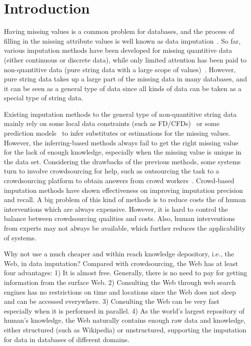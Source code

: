 \documentclass[sigconf]{acmart}
\begin{document}
%
%

\maketitle

\section{Introduction}

Having missing values is a common problem for databases, and the process of filling in the missing attribute values is well known as data imputation~\cite{li2012webput, wang2002empirical}. So far, various imputation methods have been developed for missing quantitive data (either continuous or discrete data), while only limited attention has been paid to non-quantitive data (pure string data with a large scope of values)~\cite{li2015trip}. However, pure string data takes up a large part of the missing data in many databases, and it can be seen as a general type of data since all kinds of data can be taken as a special type of string data.


Existing imputation methods to the general type of non-quantitive string data mainly rely on some local data constraints (such as FD/CFDs)~\cite{wu2004using, shen2007combined, bohannon2007conditional} or some prediction models~\cite{wang2002empirical, zhang2008parimputation} to infer substitutes or estimations for the missing values. However, the inferring-based methods always fail to get the right missing value for the lack of enough knowledge, especially when the missing value is unique in the data set. Considering the drawbacks of the previous methods, some systems turn to involve crowdsourcing for help, such as outsourcing the task to a crowdsourcing platform to obtain answers from crowd workers~\cite{ye2014capture, franklin2011crowddb}.
%
Crowd-based imputation methods have shown effectiveness on improving imputation precision and recall. A big problem of this kind of methods is to reduce costs the of human interventions which are always expensive. However, it is hard to control the balance between crowdsourcing qualities and costs. Also, human interventions from experts may not always be available, which further reduces the applicability of systems.


Why not use a much cheaper and within reach knowledge depository, i.e., the Web, in data imputation? Compared with crowdsourcing, the Web has at least four advantages: 1) It is almost free. Generally, there is no need to pay for getting information from the surface Web. 2) Consulting the Web through web search engines has no restrictions on time and locations since the Web does not sleep and can be accessed everywhere. 3) Consulting the Web can be very fast especially when it is performed in parallel. 4) As the world's largest repository of human's knowledge, the Web naturally contains enough raw data and knowledge, either structured (such as Wikipedia) or unstructured, supporting the imputation for data in databases of different domains.
\end{document}
